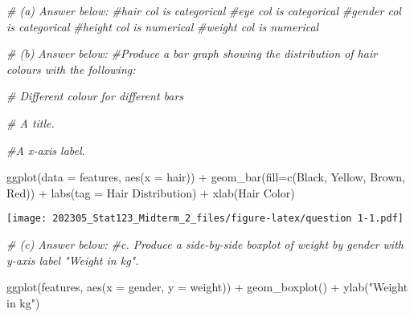 \documentclass[
]{article}
\newenvironment{Shaded}{\begin{snugshade}}{\end{snugshade}}
\newcommand{\AttributeTok}[1]{\textcolor[rgb]{0.77,0.63,0.00}{#1}}
\newcommand{\CommentTok}[1]{\textcolor[rgb]{0.56,0.35,0.01}{\textit{#1}}}
\newcommand{\FunctionTok}[1]{\textcolor[rgb]{0.00,0.00,0.00}{#1}}
\newcommand{\NormalTok}[1]{#1}
\newcommand{\SpecialCharTok}[1]{\textcolor[rgb]{0.00,0.00,0.00}{#1}}
\newcommand{\StringTok}[1]{\textcolor[rgb]{0.31,0.60,0.02}{#1}}
\begin{document}
\begin{Shaded}
\begin{Highlighting}[]
\CommentTok{\# (a) Answer below:}
\CommentTok{\#hair col is categorical}
\CommentTok{\#eye col is categorical }
\CommentTok{\#gender col is categorical}
\CommentTok{\#height col is numerical }
\CommentTok{\#weight col is numerical}

\CommentTok{\# (b) Answer below:}
\CommentTok{\#Produce a bar graph showing the distribution of hair colours with the following:}

 \CommentTok{\#  Different colour for different bars}

  \CommentTok{\# A title.}

   \CommentTok{\#A x{-}axis label.}
   
\FunctionTok{ggplot}\NormalTok{(}\AttributeTok{data =}\NormalTok{ features, }\FunctionTok{aes}\NormalTok{(}\AttributeTok{x =}\NormalTok{ hair)) }\SpecialCharTok{+} 
  \FunctionTok{geom\_bar}\NormalTok{(}\AttributeTok{fill=}\FunctionTok{c}\NormalTok{(}\StringTok{\textquotesingle{}Black\textquotesingle{}}\NormalTok{, }\StringTok{\textquotesingle{}Yellow\textquotesingle{}}\NormalTok{, }\StringTok{\textquotesingle{}Brown\textquotesingle{}}\NormalTok{, }\StringTok{\textquotesingle{}Red\textquotesingle{}}\NormalTok{)) }\SpecialCharTok{+} 
  \FunctionTok{labs}\NormalTok{(}\AttributeTok{tag =} \StringTok{\textquotesingle{}Hair Distribution\textquotesingle{}}\NormalTok{) }\SpecialCharTok{+} 
  \FunctionTok{xlab}\NormalTok{(}\StringTok{\textquotesingle{}Hair Color\textquotesingle{}}\NormalTok{)}
\end{Highlighting}
\end{Shaded}

\texttt{[image: 202305\_Stat123\_Midterm\_2\_files/figure-latex/question 1-1.pdf]}

\begin{Shaded}
\begin{Highlighting}[]
\CommentTok{\# (c) Answer below:}
  \CommentTok{\#c. Produce a side{-}by{-}side boxplot of weight by gender with y{-}axis label "Weight in kg".}

 \FunctionTok{ggplot}\NormalTok{(features, }\FunctionTok{aes}\NormalTok{(}\AttributeTok{x =}\NormalTok{ gender, }\AttributeTok{y =}\NormalTok{ weight)) }\SpecialCharTok{+} 
   \FunctionTok{geom\_boxplot}\NormalTok{() }\SpecialCharTok{+} 
   \FunctionTok{ylab}\NormalTok{(}\StringTok{"Weight in kg"}\NormalTok{)}
\end{Highlighting}
\end{Shaded}
\end{document}
